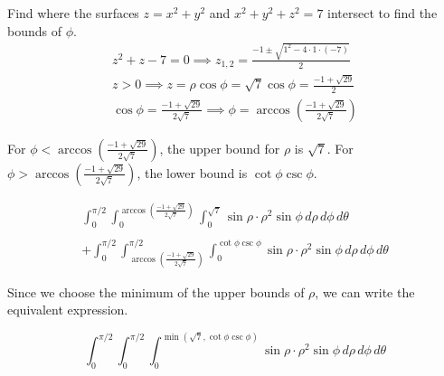 \documentclass{article}
\begin{document}
Find where the surfaces $z=x^2+y^2$ and $x^2+y^2+z^2=7$ intersect to find the bounds of $\phi$.
\[\begin{array}{c}\displaystyle z^2+z-7=0\implies z_{1,2}=\frac{-1\pm\sqrt{1^2-4\cdot1\cdot(-7)}}2\\[1em]\displaystyle z>0\implies z=\rho\cos\phi=\sqrt7\cos\phi=\frac{-1+\sqrt{29}}{2}\\[1em]\displaystyle\cos\phi=\frac{-1+\sqrt{29}}{2\sqrt7}\implies\phi=\arccos\left(\frac{-1+\sqrt{29}}{2\sqrt7}\right)\end{array}\]

For $\displaystyle\phi<\arccos\left(\frac{-1+\sqrt{29}}{2\sqrt7}\right)$, the upper bound for $\rho$ is $\sqrt7$. For $\displaystyle\phi>\arccos\left(\frac{-1+\sqrt{29}}{2\sqrt7}\right)$, the lower bound is $\cot\phi\csc\phi$.

\[\boxed{\begin{array}{l}\displaystyle\int_0^{\pi/2}\int_0^{\arccos\left(\textstyle\frac{-1+\sqrt{29}}{2\sqrt7}\right)}\int_0^{\sqrt7}\sin\rho \cdot\rho^2\sin\phi\,d\rho\,d\phi\,d\theta\\\\\displaystyle+\int_0^{\pi/2}\int_{\arccos\left(\textstyle\frac{-1+\sqrt{29}}{2\sqrt7}\right)}^{\pi/2}\int_0^{\cot\phi\csc\phi}\sin\rho\cdot\rho^2\sin\phi\,d\rho\,d\phi\,d\theta\end{array}}\]

Since we choose the minimum of the upper bounds of $\rho$, we can write the equivalent expression.

\[\boxed{\int_0^{\pi/2}\int_0^{\pi/2}\int_0^{\min\left(\sqrt7,\cot\phi\csc\phi\right)}\sin\rho\cdot\rho^2\sin\phi\,d\rho\,d\phi\,d\theta}\]
\end{document}
